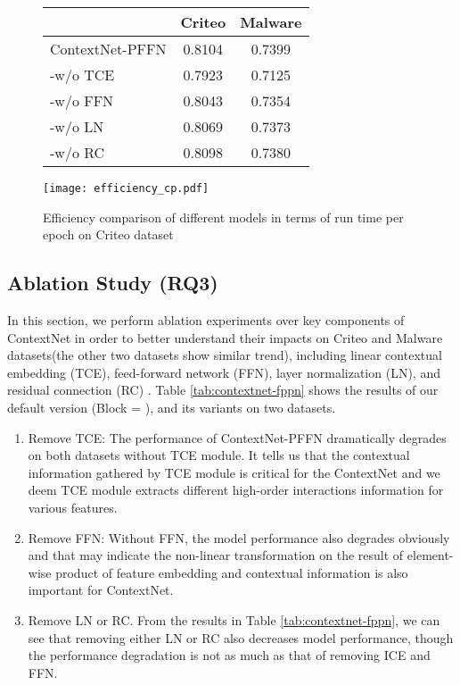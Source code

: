 \documentclass[sigconf]{acmart}
\begin{document}
\begin{figure}
  \begin{minipage}[b]{.45\linewidth}
    \centering
    \begin{tabular}{l|cc}
    \toprule
      & \textbf{Criteo} & \textbf{Malware}   \\
    \midrule
    ContextNet-PFFN & 0.8104 & 0.7399 \\
    -w/o TCE &  0.7923 &  0.7125 \\
      -w/o FFN & 0.8043 & 0.7354 \\
      -w/o LN & 0.8069 & 0.7373 \\
      -w/o RC & 0.8098 & 0.7380 \\
    \bottomrule
    \end{tabular}
    \label{tab:contextnet-fppn}
    \end{minipage}
    \begin{minipage}[b]{.45\linewidth}
      \centering
      \texttt{[image: efficiency\_cp.pdf]}
      \caption{Efficiency comparison of different models in terms of run time per epoch on Criteo dataset}
      \label{fig:efficiency_cp}
    \end{minipage}\end{figure}


\subsection{Ablation Study (RQ3)}
In this section, we perform ablation experiments over key components of ContextNet in order to better understand their impacts on Criteo and Malware datasets(the other two datasets show similar trend), including linear contextual embedding (TCE), feed-forward network (FFN), layer normalization (LN), and residual connection (RC) . Table \ref{tab:contextnet-fppn} shows the results of our default version (Block = ), and its variants on two datasets.




\begin{enumerate}
  \item Remove TCE: The performance of ContextNet-PFFN dramatically degrades on both datasets without TCE module. It tells us that the contextual information gathered by TCE module is critical for the ContextNet and we deem TCE module extracts different high-order interactions information for various features.

  \item Remove FFN: Without FFN, the model performance also degrades obviously and that may indicate the non-linear transformation on the result of element-wise product of feature embedding and contextual information is also important for ContextNet.

  \item Remove LN or RC. From the results in Table \ref{tab:contextnet-fppn}, we can see that removing either LN or RC also decreases model performance, though the performance degradation is not as much as that of  removing ICE and FFN.
\end{enumerate}
\end{document}
